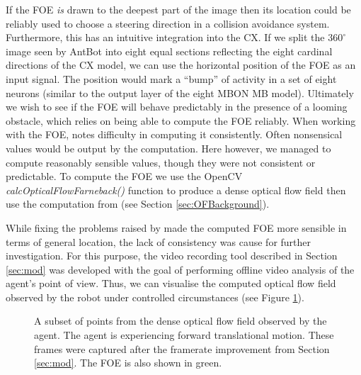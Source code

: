 \documentclass[a4paper,11pt,twoside,openright]{article}
\begin{document}
If the FOE \textit{is} drawn to the deepest part of the image then its location
could be reliably used to choose a steering direction in a collision avoidance
system. Furthermore, this has an
intuitive integration into the CX. If we split the $360^{\circ}$ image seen by
AntBot into eight equal sections reflecting the eight cardinal directions of the
CX model, we can use the horizontal position of the FOE as an input signal. The
position would mark a ``bump'' of activity in a set of eight neurons (similar to
the output layer of the eight MBON MB model). Ultimately we wish to see if the
FOE will behave predictably in the presence of a looming obstacle, which relies
on being able to compute the FOE reliably.
When working with the FOE, \cite{Mitchell2018} notes difficulty in computing it
consistently. Often nonsensical values would be output by the computation. Here
however, we managed to compute reasonably sensible values, though they were not
consistent or predictable. To compute the FOE we use the OpenCV
\textit{calcOpticalFlowFarneback()} function to produce a dense optical flow
field then use the computation from \cite{ODonovan2005} (see Section
\ref{sec:OFBackground}).
\newline
\par

While fixing the problems raised by \cite{Mitchell2018} made the computed FOE
more sensible in terms of general location, the lack of consistency was cause
for further investigation. For this purpose, the video recording tool described
in Section \ref{sec:mod} was developed with the goal of performing offline
video analysis of the agent's point of view. Thus, we can visualise the
computed optical flow field observed by the robot under controlled circumstances
(see Figure \ref{fig:flowfield}).

\begin{figure}[h!]
  \centering
  \caption{\label{fig:flowfield}
    A subset of points from the dense optical flow field observed by the agent.
    The agent is experiencing forward translational motion. These frames were
    captured after the framerate improvement from Section \ref{sec:mod}. The
    FOE is also shown in green.
  }
\end{figure}
\end{document}

